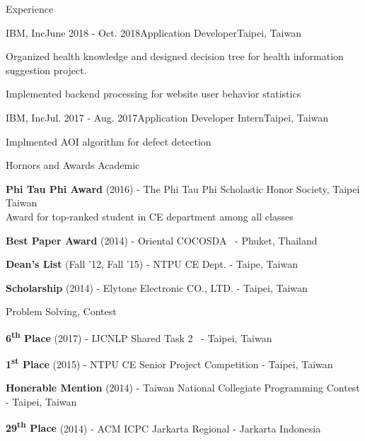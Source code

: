 \documentclass{resume} %
\newcommand{\ts}{\textsuperscript}
\begin{document}
\begin{rSection}{Experience}
    \begin{rSubsection}{IBM, Inc}{June 2018 - Oct. 2018}{Application Developer}{Taipei, Taiwan}
        \item Organized health knowledge and designed decision tree for health information suggestion project. 
        \item Implemented backend processing for website user behavior statistics 
\end{rSubsection}
\begin{rSubsection}{IBM, Inc}{Jul. 2017 - Aug. 2017}{Application Developer Intern}{Taipei, Taiwan}
        \item Implmented AOI algorithm for defect detection 
\end{rSubsection}
\end{rSection}


\begin{rSection}{Hornors and Awards}
Academic
\begin{rSubsection}{}{}{}{}
\item {\bf Phi Tau Phi Award} (2016) - The Phi Tau Phi Scholastic Honor Society, Taipei Taiwan \\
Award for top-ranked student in CE department among all classes
\item {\bf Best Paper Award} (2014) - Oriental COCOSDA~\cite{hung2014investigation} - Phuket, Thailand
\item {\bf Dean's List} (Fall '12, Fall '15) - NTPU CE Dept. - Taipe, Taiwan
\item {\bf Scholarship} (2014) - Elytone Electronic CO., LTD. - Taipei, Taiwan
\end{rSubsection}

Problem Solving, Contest
\begin{rSubsection}{}{}{}{}
\item {\bf 6\ts{th} Place} (2017) - IJCNLP Shared Task 2~\cite{lee2017nctu} - Taipei, Taiwan
\item {\bf 1\ts{st} Place} (2015) - NTPU CE Senior Project Competition - Taipei, Taiwan
\item {\bf Honerable Mention} (2014) - Taiwan National Collegiate Programming Contest - Taipei, Taiwan
\item {\bf 29\ts{th} Place} (2014) - ACM ICPC Jarkarta Regional - Jarkarta Indonesia
\end{rSubsection}

\end{rSection}
\end{document}
